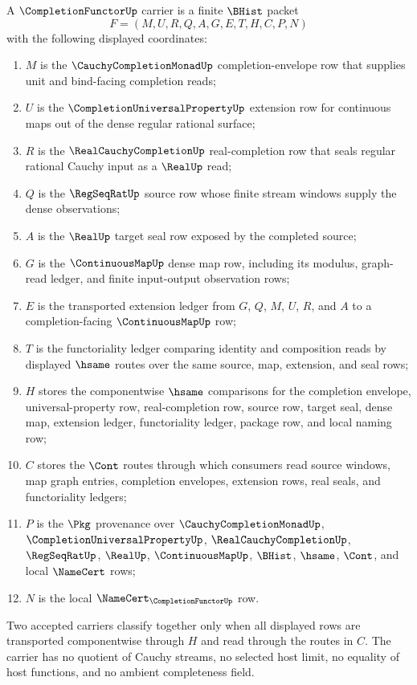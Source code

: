 \begin{definition}
\label{def:completion-functor-carrier}
A $\CompletionFunctorUp$ carrier is a finite $\BHist$ packet
$$
F=(M,U,R,Q,A,G,E,T,H,C,P,N)
$$
with the following displayed coordinates:
\begin{enumerate}
\item $M$ is the $\CauchyCompletionMonadUp$ completion-envelope row that supplies unit and bind-facing completion reads;
\item $U$ is the $\CompletionUniversalPropertyUp$ extension row for continuous maps out of the dense regular rational surface;
\item $R$ is the $\RealCauchyCompletionUp$ real-completion row that seals regular rational Cauchy input as a $\RealUp$ read;
\item $Q$ is the $\RegSeqRatUp$ source row whose finite stream windows supply the dense observations;
\item $A$ is the $\RealUp$ target seal row exposed by the completed source;
\item $G$ is the $\ContinuousMapUp$ dense map row, including its modulus, graph-read ledger, and finite input-output observation rows;
\item $E$ is the transported extension ledger from $G$, $Q$, $M$, $U$, $R$, and $A$ to a completion-facing $\ContinuousMapUp$ row;
\item $T$ is the functoriality ledger comparing identity and composition reads by displayed $\hsame$ routes over the same source, map, extension, and seal rows;
\item $H$ stores the componentwise $\hsame$ comparisons for the completion envelope, universal-property row, real-completion row, source row, target seal, dense map, extension ledger, functoriality ledger, package row, and local naming row;
\item $C$ stores the $\Cont$ routes through which consumers read source windows, map graph entries, completion envelopes, extension rows, real seals, and functoriality ledgers;
\item $P$ is the $\Pkg$ provenance over $\CauchyCompletionMonadUp$, $\CompletionUniversalPropertyUp$, $\RealCauchyCompletionUp$, $\RegSeqRatUp$, $\RealUp$, $\ContinuousMapUp$, $\BHist$, $\hsame$, $\Cont$, and local $\NameCert$ rows;
\item $N$ is the local $\NameCert_{\CompletionFunctorUp}$ row.
\end{enumerate}
Two accepted carriers classify together only when all displayed rows are transported componentwise through $H$ and read through the routes in $C$. The carrier has no quotient of Cauchy streams, no selected host limit, no equality of host functions, and no ambient completeness field.
\end{definition}

